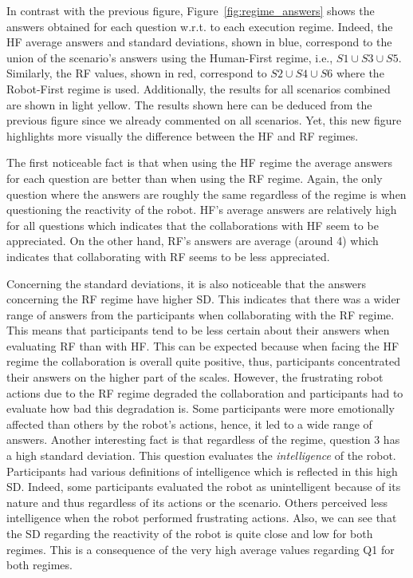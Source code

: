 In contrast with the previous figure, Figure~\ref{fig:regime_answers} shows the answers obtained for each question w.r.t. to each execution regime. Indeed, the HF average answers and standard deviations, shown in blue, correspond to the union of the scenario's answers using the Human-First regime, i.e., $S1 \cup S3 \cup S5$. Similarly, the RF values, shown in red, correspond to $S2 \cup S4 \cup S6$ where the Robot-First regime is used. Additionally, the results for all scenarios combined are shown in light yellow. The results shown here can be deduced from the previous figure since we already commented on all scenarios. Yet, this new figure highlights more visually the difference between the HF and RF regimes. 

The first noticeable fact is that when using the HF regime the average answers for each question are better than when using the RF regime. Again, the only question where the answers are roughly the same regardless of the regime is when questioning the reactivity of the robot. HF's average answers are relatively high for all questions which indicates that the collaborations with HF seem to be appreciated. On the other hand, RF's answers are average (around 4) which indicates that collaborating with RF seems to be less appreciated.

Concerning the standard deviations, it is also noticeable that the answers concerning the RF regime have higher SD. This indicates that there was a wider range of answers from the participants when collaborating with the RF regime. This means that participants tend to be less certain about their answers when evaluating RF than with HF. This can be expected because when facing the HF regime the collaboration is overall quite positive, thus, participants concentrated their answers on the higher part of the scales. However, the frustrating robot actions due to the RF regime degraded the collaboration and participants had to evaluate how bad this degradation is. Some participants were more emotionally affected than others by the robot's actions, hence, it led to a wide range of answers.
Another interesting fact is that regardless of the regime, question 3 has a high standard deviation. This question evaluates the \textit{intelligence} of the robot. Participants had various definitions of intelligence which is reflected in this high SD. Indeed, some participants evaluated the robot as unintelligent because of its nature and thus regardless of its actions or the scenario. Others perceived less intelligence when the robot performed frustrating actions. 
Also, we can see that the SD regarding the reactivity of the robot is quite close and low for both regimes. This is a consequence of the very high average values regarding Q1 for both regimes.   

